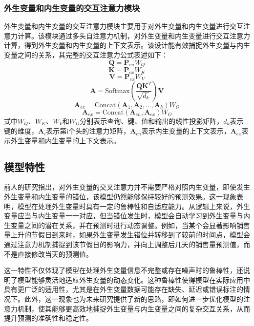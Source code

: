 \documentclass[12pt]{article}
\begin{document}
\subsubsection*{外生变量和内生变量的交互注意力模块}
外生变量和内生变量的交互注意力模块主要用于对外生变量和内生变量进行交互注意力计算。该模块通过多头自注意力机制，对外生变量和内生变量进行交互注意力计算，得到外生变量和内生变量的上下文表示。该设计能有效捕捉外生变量与内生变量之间的关系，其完整的交互注意力公式表述如下：
\begin{equation*}
    \mathbf{Q} = \mathbf{P}_{en}W_Q
\end{equation*}
\begin{equation*}
    \mathbf{K} = \mathbf{P}_{ex}W_K
\end{equation*}
\begin{equation*}
    \mathbf{V} = \mathbf{P}_{ex}W_V
\end{equation*}
\begin{equation}
    \mathbf{A} = \text{Softmax}\left(\frac{\mathbf{Q}\mathbf{K}^T}{\sqrt{d_k}}\right)\mathbf{V}
\end{equation}
\begin{equation*}
    \mathbf{A}_{ex} = \text{Concat}(\mathbf{A}_1, \mathbf{A}_2, \ldots, \mathbf{A}_h)W_O
\end{equation*}
\begin{equation*}
    \mathbf{A}_{ex} = \text{Concat}(\mathbf{A}_{en}, \mathbf{A}_{ex})W_O
\end{equation*}
式中$W_Q$、$W_K$、$W_V$和$W_O$分别表示查询、键、值和输出的线性投影矩阵，$d_k$表示键的维度，$\mathbf{A}_i$表示第i个头的注意力矩阵，$\mathbf{A}_{en}$表示内生变量的上下文表示，$\mathbf{A}_{ex}$表示外生变量和内生变量的上下文表示。

\subsection{模型特性}
前人的研究指出，对外生变量的交叉注意力并不需要严格对照内生变量，即使发生外生变量和内生变量的错位，该模型仍然能够保持较好的预测效果。这一现象表明，模型在处理外生变量时具有一定的鲁棒性和自适应能力。从逻辑上来说，外生变量应当与内生变量一一对应，但当错位发生时，模型会自动学习到外生变量与内生变量之间的潜在关系，并在预测时进行动态调整。例如，当某个会显著影响销售量上升的节假日到来时，如果外生变量发生错位并转移到了较前的时间点，模型会通过注意力机制捕捉到该节假日的影响力，并向上调整后几天的销售量预测值，而不是直接修改当天的预测值。

这一特性不仅体现了模型在处理外生变量信息不完整或存在噪声时的鲁棒性，还说明了模型能够灵活地适应外生变量的动态变化。这种鲁棒性使得模型在实际应用中具有更广泛的适用性，尤其是在外生变量数据可能存在缺失、延迟或错误标注的情况下。此外，这一现象也为未来研究提供了新的思路，即如何进一步优化模型的注意力机制，使其能够更高效地捕捉外生变量与内生变量之间的复杂交互关系，从而提升预测的准确性和稳定性。
\end{document}
